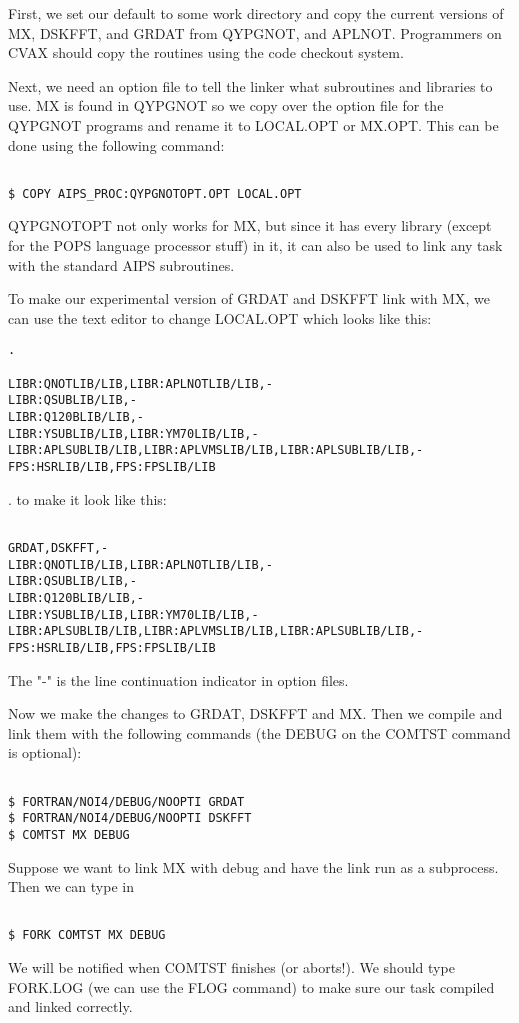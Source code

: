 First, we set our default to some work directory and copy the current
versions of MX,
DSKFFT, and
GRDAT from QYPGNOT, and APLNOT. Programmers on CVAX should copy the routines
using the code checkout system.

Next, we need an option file to tell the linker what subroutines and
libraries to use.  MX is found in QYPGNOT so we
copy over the option file for the QYPGNOT programs and rename it to
LOCAL.OPT or MX.OPT. This can be done using the following command:
\begin{verbatim}

$ COPY AIPS_PROC:QYPGNOTOPT.OPT LOCAL.OPT

\end{verbatim}

QYPGNOTOPT not only works for MX, but since it has every
library (except for the POPS language processor stuff)
in it, it can also be used to link any task with the standard AIPS
subroutines.

To make our experimental version of GRDAT and DSKFFT
link with MX, we can use the text editor to change LOCAL.OPT which
looks like this:
\begin{verbatim}.

LIBR:QNOTLIB/LIB,LIBR:APLNOTLIB/LIB,-
LIBR:QSUBLIB/LIB,-
LIBR:Q120BLIB/LIB,-
LIBR:YSUBLIB/LIB,LIBR:YM70LIB/LIB,-
LIBR:APLSUBLIB/LIB,LIBR:APLVMSLIB/LIB,LIBR:APLSUBLIB/LIB,-
FPS:HSRLIB/LIB,FPS:FPSLIB/LIB

\end{verbatim}.
to make it look like this:
\begin{verbatim}

GRDAT,DSKFFT,-
LIBR:QNOTLIB/LIB,LIBR:APLNOTLIB/LIB,-
LIBR:QSUBLIB/LIB,-
LIBR:Q120BLIB/LIB,-
LIBR:YSUBLIB/LIB,LIBR:YM70LIB/LIB,-
LIBR:APLSUBLIB/LIB,LIBR:APLVMSLIB/LIB,LIBR:APLSUBLIB/LIB,-
FPS:HSRLIB/LIB,FPS:FPSLIB/LIB

\end{verbatim}
The "-" is the line continuation indicator in option files.

Now we make the changes to GRDAT, DSKFFT and MX.  Then we compile and link them
with the following commands (the DEBUG on the COMTST command is optional):
\begin{verbatim}

$ FORTRAN/NOI4/DEBUG/NOOPTI GRDAT
$ FORTRAN/NOI4/DEBUG/NOOPTI DSKFFT
$ COMTST MX DEBUG

\end{verbatim}

Suppose we want to link MX with debug and have the link run as a
subprocess.  Then we can type in
\begin{verbatim}

$ FORK COMTST MX DEBUG

\end{verbatim}
We will be notified when COMTST finishes (or aborts!).  We should
type FORK.LOG (we can use the FLOG command) to make sure our
task compiled
and linked correctly.

